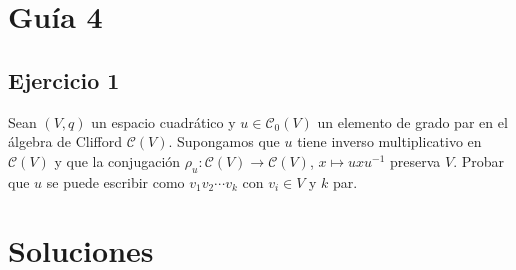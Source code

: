 \documentclass[12pt]{amsart}
\newcommand{\cont}{\mathcal{C}}
\theoremstyle{plain}
\begin{document}
\section*{Guía 4}


\subsection*{Ejercicio 1} Sean $(V, q)$ un espacio cuadrático y 
$u \in \cont_0(V )$ un elemento de grado par en el álgebra de Clifford 
$\cont(V )$. Supongamos que $u$ tiene inverso multiplicativo en 
$\cont(V )$ y que la conjugación $\rho_u:\cont(V)\to\cont(V)$, 
$x \mapsto uxu^{-1}$ preserva $V$. Probar que $u$ se puede escribir
como $v_1v_2 \cdots v_k$ con $v_i \in V$ y $k$ par.





\newpage

\section*{Soluciones}



\end{document}

